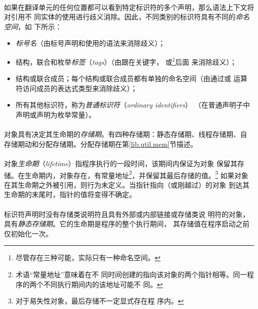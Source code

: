 {\paragraph{}
如果在翻译单元的任何位置都可以看到特定标识符的多个声明，那么语法上下文将对引用不
同实体的使用进行歧义消除。因此，不同类别的标识符具有不同的\textit{命名空间}，如
下所示：
\begin{itemize}
  \item{\textit{标号名}（由标号声明和使用的语法来消除歧义）；}
  \item{结构，联合和枚举\textit{标签}（\textit{tags}）（由跟在关键字，
    或\footnote{尽管存在三种可能，实际只有一种命名空间。}后面
    来消除歧义）；}
  \item{结构或联合成员；每个结构或联合成员都有单独的命名空间（由通过或
    \tm{->}运算符访问成员的表达式类型来消除歧义）；}
  \item{所有其他标识符，称为\textit{普通标识符}（\textit{ordinary identifiers}）
    （在普通声明子中声明或声明为枚举常量）。}
\end{itemize}


\paragraph{}
对象具有决定其生命期的\textit{存储期}。有四种存储期：静态存储期、线程存储期、自
存储期动和分配存储期。分配存储期在第\ref{lib.util.mem}节描述。

\paragraph{}
对象\textit{生命期}（\textit{lifetime}）指程序执行的一段时间，该期间内保证为对象
保留其存储。在生命期内，对象存在，有常量地址\footnote{术语``常量地址''意味着在不
同时间创建的指向该对象的两个指针相等。同一程序的两个不同执行期间内的该地址可能不
同。}，并保留其最后存储的值。\footnote{对于易失性对象，最后存储不一定显式存在程
序内。} 如果对象在其生命期之外被引用，则行为未定义。当指针指向（或刚越过）的对象
到达其生命期的末尾时，指针的值将变得不确定。

\paragraph{}
标识符声明时没有存储类说明符且具有外部或内部链接或存储类说
明符的对象，具有\textit{静态存储期}。它的生命期是程序的整个执行期间，
其存储值在程序启动之前仅初始化一次。

}
